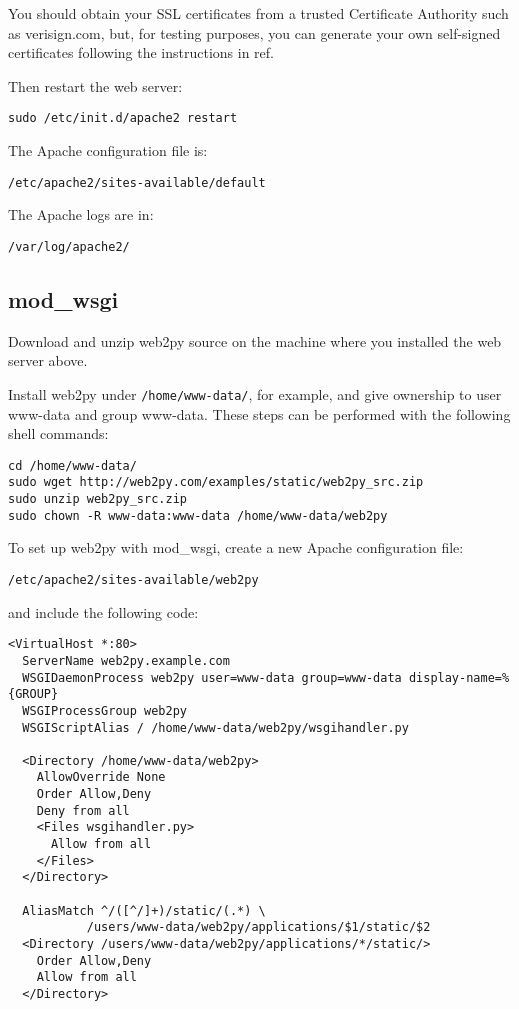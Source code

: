 \documentclass[justified,sixbynine,notoc]{tufte-book}
\def\ft{\small\tt}
\begin{document}
\begin{fullwidth}
You should obtain your SSL certificates from a trusted Certificate Authority such as verisign.com, but, for testing purposes, you can generate your own self-signed certificates following the instructions in ref.~\cite{openssl}

Then restart the web server:
\begin{lstlisting}
sudo /etc/init.d/apache2 restart
\end{lstlisting}

The Apache configuration file is:
\begin{lstlisting}
/etc/apache2/sites-available/default
\end{lstlisting}

The Apache logs are in:
\begin{lstlisting}
/var/log/apache2/
\end{lstlisting}

\goodbreak\subsection{mod\_wsgi}

Download and unzip web2py source on the machine where you installed the web server above.

Install web2py under {\ft /home/www-data/}, for example, and give ownership to user www-data and group www-data. These steps can be performed with the following shell commands:
\begin{lstlisting}
cd /home/www-data/
sudo wget http://web2py.com/examples/static/web2py_src.zip
sudo unzip web2py_src.zip
sudo chown -R www-data:www-data /home/www-data/web2py
\end{lstlisting}

To set up web2py with mod\_wsgi, create a new Apache configuration file:
\begin{lstlisting}
/etc/apache2/sites-available/web2py
\end{lstlisting}
\noindent and include the following code:
\begin{lstlisting}[keywords={}]
<VirtualHost *:80>
  ServerName web2py.example.com
  WSGIDaemonProcess web2py user=www-data group=www-data display-name=%{GROUP}
  WSGIProcessGroup web2py
  WSGIScriptAlias / /home/www-data/web2py/wsgihandler.py

  <Directory /home/www-data/web2py>
    AllowOverride None
    Order Allow,Deny
    Deny from all
    <Files wsgihandler.py>
      Allow from all
    </Files>
  </Directory>

  AliasMatch ^/([^/]+)/static/(.*) \
           /users/www-data/web2py/applications/$1/static/$2
  <Directory /users/www-data/web2py/applications/*/static/>
    Order Allow,Deny
    Allow from all
  </Directory>


\end{lstlisting}
\end{fullwidth}
\end{document}
